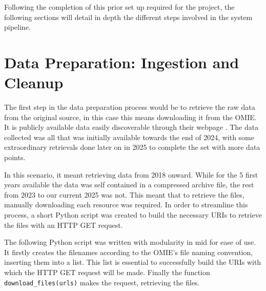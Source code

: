 \documentclass[12pt]{report} %
\begin{document}
Following the completion of this prior set up required for the project, the following sections will detail in depth the different steps involved in the system pipeline.


\section{Data Preparation: Ingestion and Cleanup}


The first step in the data preparation process would be to retrieve the raw data from the original source, in this case this means downloading it from the OMIE. It is publicly available data easily discoverable through their webpage \cite{omie_datos}. The data collected was all that was initially available towards the end of 2024, with some extraordinary retrievals done later on in 2025 to complete the set with more data points.

In this scenario, it meant retrieving data from 2018 onward. While for the 5 first years available the data was self contained in a compressed archive file, the rest from 2023 to our current 2025 was not. This meant that to retrieve the files, manually downloading each resource was required. In order to streamline this process, a short Python script was created to build the necessary URIs to retrieve the files with an HTTP GET request.

The following Python script was written with modularity in mid for ease of use. It firstly creates the filenames according to the OMIE's file naming convention, inserting them into a list. This list is essential to successfully build the URIs with which the HTTP GET request will be made. Finally the function \small{\verb|download_files(urls)|} makes the request, retrieving the files.
\end{document}
